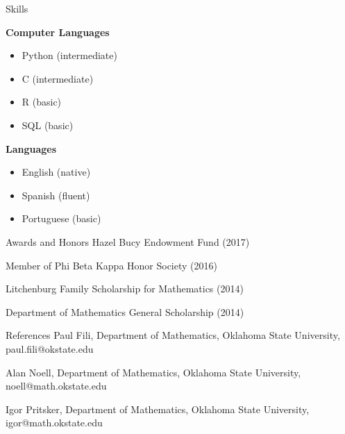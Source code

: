 \documentclass{resume} %
\begin{document}
\begin{rSection}{Skills}

{\bf Computer Languages}
\begin{itemize}
\item Python (intermediate)
\item C (intermediate)
\item R (basic)
\item SQL (basic)
\end{itemize}

{\bf Languages}
\begin{itemize}
\item English (native)
\item Spanish (fluent)
\item Portuguese (basic)
\end{itemize}

\end{rSection}

\begin{rSection}{Awards and Honors}
Hazel Bucy Endowment Fund (2017)

Member of Phi Beta Kappa Honor Society (2016)

Litchenburg Family Scholarship for Mathematics (2014)

Department of Mathematics General  Scholarship (2014)
\end{rSection}
\newpage
\begin{rSection}{References}
Paul Fili, Department of Mathematics, Oklahoma State University, paul.fili@okstate.edu

Alan Noell, Department of Mathematics, Oklahoma State University, noell@math.okstate.edu

Igor Pritsker, Department of Mathematics, Oklahoma State University, igor@math.okstate.edu
\end{rSection}
\end{document}
